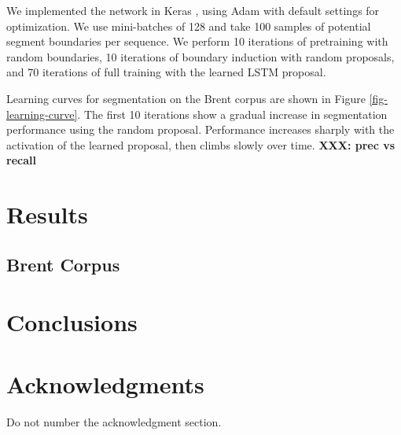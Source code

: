 \documentclass[11pt,letterpaper]{article}
\newcommand{\xxx}[1]{\textbf{\color{red}XXX: #1}}
\begin{document}
We implemented the network in Keras \cite{xxx}, using Adam \cite{xxx}
with default settings for optimization. We use mini-batches of 128 and
take 100 samples of potential segment boundaries per sequence. We
perform 10 iterations of pretraining with random boundaries, 10
iterations of boundary induction with random proposals, and 70
iterations of full training with the learned LSTM proposal.

Learning curves for segmentation on the Brent corpus are shown in
Figure \ref{fig-learning-curve}. The first 10 iterations show a
gradual increase in segmentation performance using the random
proposal. Performance increases sharply with the activation of
the learned proposal, then climbs slowly over time. \xxx{prec vs recall}

\section{Results}

\subsection{Brent Corpus}

\section{Conclusions}

\section*{Acknowledgments}

Do not number the acknowledgment section.



\end{document}
